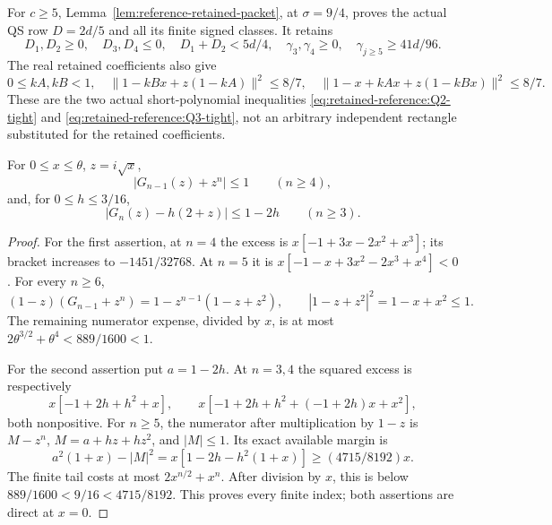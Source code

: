 For \(c\ge5\), Lemma~\ref{lem:reference-retained-packet}, at
\(\sigma=9/4\), proves the actual QS row \(D=2d/5\) and all
its finite signed classes. It retains
\[
 D_1,D_2\ge0,\quad D_3,D_4\le0,\quad
 D_1+D_2<5d/4,\quad
 \gamma_3,\gamma_4\ge0,\quad\gamma_{j\ge5}\ge41d/96.
\]
The real retained coefficients also give
\begin{equation}\label{eq:unit-p:data-27}
0\le kA,kB<1,\quad
 \|1-kBx+z(1-kA)\|^2\le8/7,\quad
 \|1-x+kAx+z(1-kBx)\|^2\le8/7 .
\end{equation}
These are the two actual short-polynomial inequalities
\eqref{eq:retained-reference:Q2-tight} and
\eqref{eq:retained-reference:Q3-tight}, not an arbitrary
independent rectangle substituted for the retained coefficients.

\begin{lemma}
\label{lem:unit-p:geometric}
For \(0\le x\le\theta\), \(z=i\sqrt x\),
\begin{equation}\label{eq:unit-p:data-28}
|G_{n-1}(z)+z^n|\le1\qquad(n\ge4),
\end{equation}
and, for \(0\le h\le3/16\),
\begin{equation}\tag{Q102.5.6}\label{eq:Q102:5.6}
 |G_n(z)-h(2+z)|\le1-2h\qquad(n\ge3).
\end{equation}
\end{lemma}
\begin{proof}
For the first assertion, at \(n=4\) the excess is
\(x[-1+3x-2x^2+x^3]\); its bracket increases to
\(-1451/32768\). At \(n=5\) it is
\(x[-1-x+3x^2-2x^3+x^4]<0\).
For every \(n\ge6\),
\[
 (1-z)(G_{n-1}+z^n)
   =1-z^{n-1}(1-z+z^2),\qquad |1-z+z^2|^2=1-x+x^2\le1.
\]
The remaining numerator expense, divided by \(x\), is at most
\(2\theta^{3/2}+\theta^4<889/1600<1\).

For the second assertion put \(a=1-2h\).
At \(n=3,4\) the squared excess is respectively
\[
 x[-1+2h+h^2+x],\qquad
 x[-1+2h+h^2+(-1+2h)x+x^2],
\]
both nonpositive.
For \(n\ge5\), the numerator after multiplication by \(1-z\) is
\(M-z^n\), \(M=a+hz+hz^2\), and \(|M|\le1\).
Its exact available margin is
\[
 a^2(1+x)-|M|^2
  =x[1-2h-h^2(1+x)]\ge(4715/8192)x .
\]
The finite tail costs at most \(2x^{n/2}+x^n\).
After division by \(x\), this is below
\(889/1600<9/16<4715/8192\).
This proves every finite index; both assertions are direct at \(x=0\).
\end{proof}


